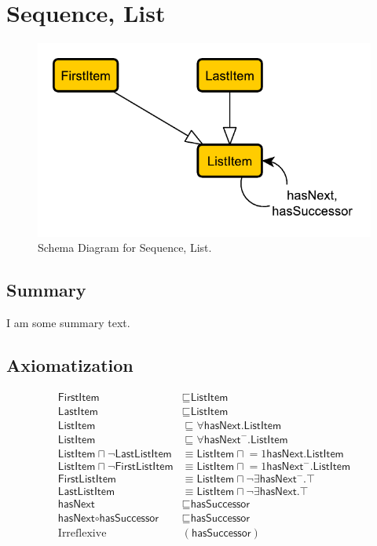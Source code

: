 \section{Sequence, List}
\label{sec:Sequence,}
\begin{figure}[h!]
\begin{center}
\includegraphics[width=.8\textwidth]{figures/sequence}
\end{center}
\caption{Schema Diagram for Sequence, List.}
\label{fig:Sequence,}
\end{figure}
\subsection{Summary}
\label{sum:Sequence,}
I am some summary text.

\subsection{Axiomatization}
\label{axs:Sequence,}
\begin{align}
\textsf{FirstItem} &\sqsubseteq \textsf{ListItem} \\
\textsf{LastItem} &\sqsubseteq \textsf{ListItem} \\
\textsf{ListItem} &\sqsubseteq \forall \textsf{hasNext.ListItem} \\
\textsf{ListItem} &\sqsubseteq \forall \textsf{hasNext}^-\textsf{.ListItem} \\
\textsf{ListItem} \sqcap \lnot \textsf{LastListItem} &\equiv \textsf{ListItem} \sqcap \mathord{=1} \textsf{hasNext.ListItem} \\
\textsf{ListItem} \sqcap \lnot \textsf{FirstListItem} &\equiv \textsf{ListItem} \sqcap \mathord{=1} \textsf{hasNext}^- \textsf{.ListItem} \\
\textsf{FirstListItem} &\equiv \textsf{ListItem} \sqcap \lnot \exists \textsf{hasNext}^-\textsf{.}\top \\
\textsf{LastListItem} &\equiv \textsf{ListItem} \sqcap \lnot \exists \textsf{hasNext.}\top \\
\textsf{hasNext} &\sqsubseteq \textsf{hasSuccessor} \\
\textsf{hasNext} \circ \textsf{hasSuccessor} &\sqsubseteq \textsf{hasSuccessor} \\
\text{Irreflexive}&(\textsf{hasSuccessor})
\end{align}

